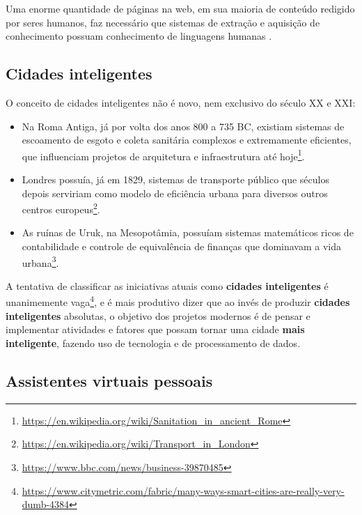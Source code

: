 Uma enorme quantidade de páginas na web, em sua maioria de conteúdo redigido por seres humanos, faz necessário que sistemas de extração e aquisição de conhecimento possuam conhecimento de linguagens humanas \cite{inteligencia-artificial}.

\subsection{Cidades inteligentes} \label{ss:cidades_inteligentes}

O conceito de cidades inteligentes não é novo, nem exclusivo do século XX e XXI:

\begin{itemize}
    \item Na Roma Antiga, já por volta dos anos 800 a 735 BC, existiam sistemas de escoamento de esgoto e coleta sanitária complexos e extremamente eficientes, que influenciam projetos de arquitetura e infraestrutura até hoje\footnote{\url{https://en.wikipedia.org/wiki/Sanitation_in_ancient_Rome}}.
    
    \item Londres possuía, já em 1829, sistemas de transporte público que séculos depois serviriam como modelo de eficiência urbana para diversos outros centros europeus\footnote{\url{https://en.wikipedia.org/wiki/Transport_in_London}}.
    
    \item As ruínas de Uruk, na Mesopotâmia, possuíam sistemas matemáticos ricos de contabilidade e controle de equivalência de finanças que dominavam a vida urbana\footnote{\url{https://www.bbc.com/news/business-39870485}}.
\end{itemize}

A tentativa de classificar as iniciativas atuais como \textbf{cidades inteligentes} é unanimemente vaga\footnote{\url{https://www.citymetric.com/fabric/many-ways-smart-cities-are-really-very-dumb-4384}}, e é mais produtivo dizer que ao invés de produzir \textbf{cidades inteligentes} absolutas, o objetivo dos projetos modernos é de pensar e implementar atividades e fatores que possam tornar uma cidade \textbf{mais inteligente}, fazendo uso de tecnologia e de processamento de dados.

\subsection{Assistentes virtuais pessoais} \label{ss:assistentes_virtuais_pessoais}

